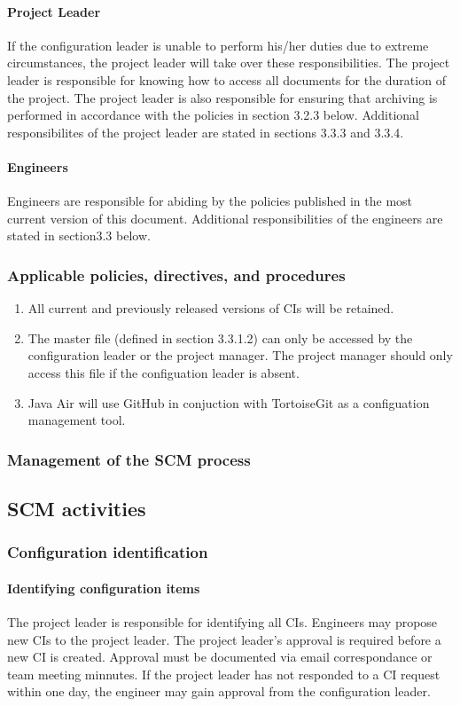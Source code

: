 \documentclass{scrartcl}
\begin{document}
\paragraph{Project Leader}
If the configuration leader is unable to perform his/her duties due to extreme circumstances, the project leader will take over these responsibilities.  The project leader is responsible for knowing how to access all documents for the duration of the project.  The project leader is also responsible for ensuring that archiving is performed in accordance with the policies in section 3.2.3 below.  Additional responsibilites of the project leader are stated in sections 3.3.3 and 3.3.4.
\paragraph{Engineers}
Engineers are responsible for abiding by the policies published in the most current version of this document.  Additional responsibilities of the engineers are stated in section3.3 below.
\subsubsection{Applicable policies, directives, and procedures}
\begin{enumerate}
\item
All current and previously released versions of CIs will be retained.
\item
The master file (defined in section 3.3.1.2) can only be accessed by the configuration leader or the project manager.  The project manager should only access this file if the configuation leader is absent.
\item
Java Air will use GitHub in conjuction with TortoiseGit as a configuation management tool.
\end{enumerate}
\subsubsection{Management of the SCM process}
\subsection{SCM activities}
\subsubsection{Configuration identification}
\paragraph{Identifying configuration items}
The project leader is responsible for identifying all CIs.  Engineers may propose new CIs to the project leader.  The project leader's approval is required before a new CI is created.  Approval must be documented via email correspondance or team meeting minnutes.  If the project leader has not responded to a CI request within one day, the engineer may gain approval from the configuration leader.
\end{document}
